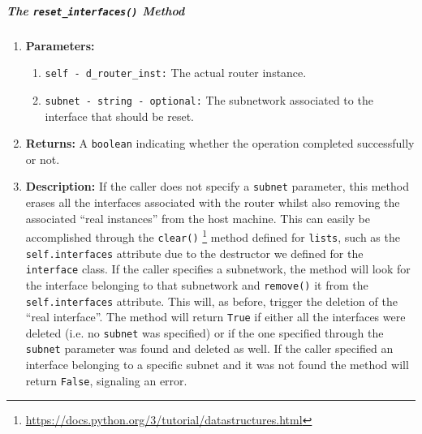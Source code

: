         \subparagraph{The \texttt{reset\_interfaces()} Method}
            \begin{enumerate}
                \item \textbf{Parameters:}
                \begin{enumerate}
                    \item \texttt{self - d\_router\_inst:} The actual router instance.
                    \item \texttt{subnet - string - optional:} The subnetwork associated to the interface that should be reset.
                \end{enumerate}
                \item \textbf{Returns:} A \texttt{boolean} indicating whether the operation completed successfully or not.
                \item \textbf{Description:} If the caller does not specify a \texttt{subnet} parameter, this method erases all the interfaces associated with the router whilst also removing the associated ``real instances'' from the host machine. This can easily be accomplished through the \texttt{clear()} \footnote{\href{https://docs.python.org/3/tutorial/datastructures.html}{https://docs.python.org/3/tutorial/datastructures.html}} method defined for \texttt{lists}, such as the \texttt{self.interfaces} attribute due to the destructor we defined for the \texttt{interface} class. If the caller specifies a subnetwork, the method will look for the interface belonging to that subnetwork and \texttt{remove()} it from the \texttt{self.interfaces} attribute. This will, as before, trigger the deletion of the ``real interface''. The method will return \texttt{True} if either all the interfaces were deleted (i.e. no \texttt{subnet} was specified) or if the one specified through the \texttt{subnet} parameter was found and deleted as well. If the caller specified an interface belonging to a specific subnet and it was not found the method will return \texttt{False}, signaling an error.
            \end{enumerate}
